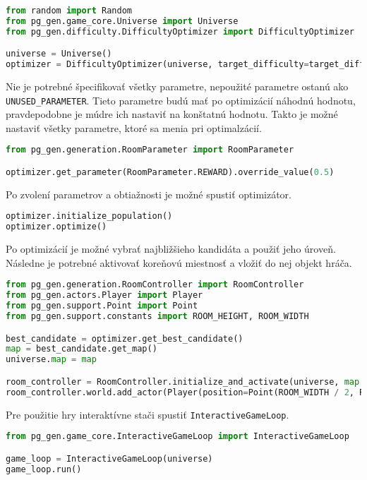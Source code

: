\begin{lstlisting}[language=python]
from random import Random
from pg_gen.game_core.Universe import Universe
from pg_gen.difficulty.DifficultyOptimizer import DifficultyOptimizer

universe = Universe()
optimizer = DifficultyOptimizer(universe, target_difficulty=target_difficulty, random=Random(108561))
\end{lstlisting}

Nie je potrebné špecifikovať všetky parametre, nepoužité parametre ostanú ako \texttt{UNUSED\_PARAMETER}. Tieto parametre budú mať po optimizácií náhodnú hodnotu, pravdepodobne je múdre ich nastaviť na konštatnú hodnotu. Takto je možné nastaviť všetky parametre, ktoré sa menia pri optimalzácií.

\begin{lstlisting}[language=python]
from pg_gen.generation.RoomParameter import RoomParameter

optimizer.get_parameter(RoomParameter.REWARD).override_value(0.5)
\end{lstlisting}

Po zvolení parametrov a obtiažnosti je možné spustiť optimizátor.

\begin{lstlisting}[language=python]
optimizer.initialize_population()
optimizer.optimize()
\end{lstlisting}

Po optimizácií je možné vybrať najbližšieho kandidáta a použiť jeho úroveň. Následne je potrebné aktivovať koreňovú miestnosť a vložiť do nej objekt hráča.

\begin{lstlisting}[language=python]
from pg_gen.generation.RoomController import RoomController
from pg_gen.actors.Player import Player
from pg_gen.support.Point import Point
from pg_gen.support.constants import ROOM_HEIGHT, ROOM_WIDTH

best_candidate = optimizer.get_best_candidate()
map = best_candidate.get_map()
universe.map = map

room_controller = RoomController.initialize_and_activate(universe, map.get_room(Point.ZERO), None)
room_controller.world.add_actor(Player(position=Point(ROOM_WIDTH / 2, ROOM_HEIGHT / 2)))
\end{lstlisting}

Pre použitie hry interaktívne stači spustiť \texttt{InteractiveGameLoop}.

\begin{lstlisting}[language=python]
from pg_gen.game_core.InteractiveGameLoop import InteractiveGameLoop

game_loop = InteractiveGameLoop(universe)
game_loop.run()
\end{lstlisting}

